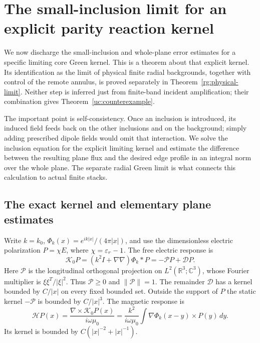 \section{The small-inclusion limit for an explicit parity reaction kernel}
\label{cl:section}

We now discharge the small-inclusion and whole-plane error estimates
for a specific limiting core Green kernel. This is a theorem about
that explicit kernel. Its identification as the limit of physical
finite radial backgrounds, together with control of the remote
annulus, is proved separately in Theorem~\ref{rg:physical-limit}.
Neither step is inferred just from finite-band incident amplification;
their combination gives Theorem~\ref{uc:counterexample}.

The important point is self-consistency. Once an inclusion is introduced,
its induced field feeds back on the other inclusions and on the background;
simply adding prescribed dipole fields would omit that interaction. We solve
the inclusion equation for the explicit limiting kernel and estimate the
difference between the resulting plane flux and the desired edge profile in
an integral norm over the whole plane. The separate radial Green limit is
what connects this calculation to actual finite stacks.

\subsection{The exact kernel and elementary plane estimates}

Write $k=k_0$, $\Phi_k(x)=e^{ik|x|}/(4\pi|x|)$, and use the
dimensionless electric polarization $P=\chi E$, where
$\chi=\varepsilon_r-1$. The free electric response is
\begin{equation}\label{cl:free}
 \mathcal K_0P=(k^2I+\nabla\nabla)\Phi_k*P
       =-\mathcal P P+\mathcal D P.
\end{equation}
Here $\mathcal P$ is the longitudinal orthogonal projection on
$L^2(\mathbb R^3;\mathbb C^3)$, whose Fourier multiplier is
$\xi\xi^T/|\xi|^2$. Thus $\mathcal P\geq0$ and
$\|\mathcal P\|=1$. The remainder $\mathcal D$ has a kernel
bounded by $C/|x|$ on every fixed bounded set. Outside the support
of $P$ the static kernel $-\mathcal P$ is bounded by $C/|x|^3$.
The magnetic response is
\begin{equation}\label{cl:magnetic}
 \mathcal HP(x)=\frac{\nabla\times\mathcal K_0P(x)}{i\omega\mu_0}
 =\frac{k^2}{i\omega\mu_0}
       \int\nabla\Phi_k(x-y)\times P(y)\,dy.
\end{equation}
Its kernel is bounded by $C(|x|^{-2}+|x|^{-1})$.

